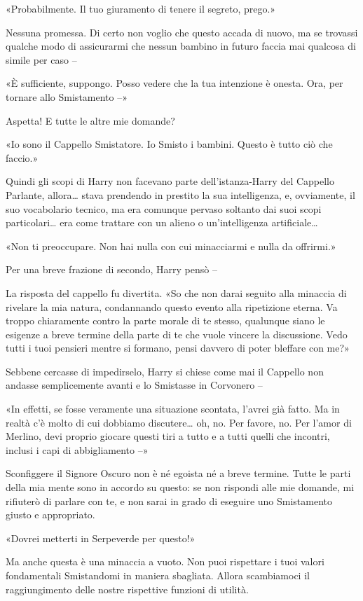 «Probabilmente. Il tuo giuramento di tenere il segreto, prego.»

Nessuna promessa. Di certo non voglio che questo accada di nuovo, ma se trovassi qualche modo di assicurarmi che nessun bambino in futuro faccia mai qualcosa di simile per caso –

«È sufficiente, suppongo. Posso vedere che la tua intenzione è onesta. Ora, per tornare allo Smistamento –»

Aspetta! E tutte le altre mie domande?

«Io sono il Cappello Smistatore. Io Smisto i bambini. Questo è tutto ciò che faccio.»

Quindi gli scopi di Harry non facevano parte dell’istanza-Harry del Cappello Parlante, allora… stava prendendo in prestito la sua intelligenza, e, ovviamente, il suo vocabolario tecnico, ma era comunque pervaso soltanto dai suoi scopi particolari… era come trattare con un alieno o un’intelligenza artificiale…

«Non ti preoccupare. Non hai nulla con cui minacciarmi e nulla da offrirmi.»

Per una breve frazione di secondo, Harry pensò –

La risposta del cappello fu divertita. «So che non darai seguito alla minaccia di rivelare la mia natura, condannando questo evento alla ripetizione eterna. Va troppo chiaramente contro la parte morale di te stesso, qualunque siano le esigenze a breve termine della parte di te che vuole vincere la discussione. Vedo tutti i tuoi pensieri mentre si formano, pensi davvero di poter bleffare con me?»

Sebbene cercasse di impedirselo, Harry si chiese come mai il Cappello non andasse semplicemente avanti e lo Smistasse in Corvonero –

«In effetti, se fosse veramente una situazione scontata, l’avrei già fatto. Ma in realtà c’è molto di cui dobbiamo discutere… oh, no. Per favore, no. Per l’amor di Merlino, devi proprio giocare questi tiri a tutto e a tutti quelli che incontri, inclusi i capi di abbigliamento –»

Sconfiggere il Signore Oscuro non è né egoista né a breve termine. Tutte le parti della mia mente sono in accordo su questo: se non rispondi alle mie domande, mi rifiuterò di parlare con te, e non sarai in grado di eseguire uno Smistamento giusto e appropriato.

«Dovrei metterti in Serpeverde per questo!»

Ma anche questa è una minaccia a vuoto. Non puoi rispettare i tuoi valori fondamentali Smistandomi in maniera sbagliata. Allora scambiamoci il raggiungimento delle nostre rispettive funzioni di utilità.

